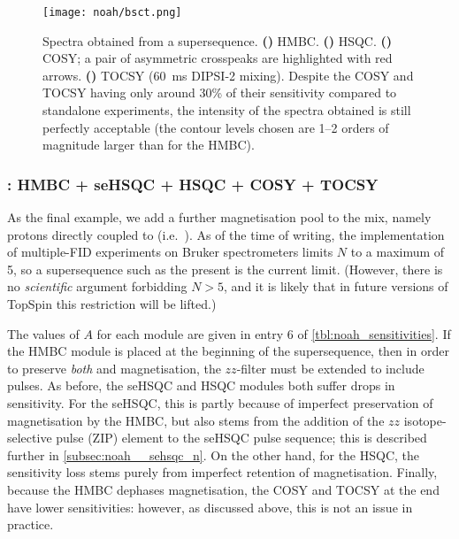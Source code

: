 \begin{figure}[!ht]
    \centering
    \texttt{[image: noah/bsct.png]}%
    {\label{fig:bsct_b}}%
    {\label{fig:bsct_s}}%
    {\label{fig:bsct_c}}%
    {\label{fig:bsct_t}}%
    \caption[Spectra obtained from a  supersequence.]{
        Spectra obtained from a  supersequence. 
        \textbf{()} HMBC.
        \textbf{()} HSQC.
        \textbf{()} COSY; a pair of asymmetric crosspeaks are highlighted with red arrows.
        \textbf{()} TOCSY (\qty{60}{\ms} DIPSI-2 mixing).
        Despite the COSY and TOCSY having only around 30\% of their sensitivity compared to standalone experiments, the intensity of the spectra obtained is still perfectly acceptable (the contour levels chosen are 1--2 orders of magnitude larger than for the HMBC).
    }
    \label{fig:bsct}
\end{figure}


\subsubsection{: HMBC + \nitrogen{} seHSQC + HSQC + COSY + TOCSY}

As the final example, we add a further magnetisation pool to the mix, namely protons directly coupled to \nitrogen{} (i.e.\ ).
As of the time of writing, the implementation of multiple-FID experiments on Bruker spectrometers limits $N$ to a maximum of 5, so a supersequence such as the present  is the current limit.
(However, there is no \textit{scientific} argument forbidding $N > 5$, and it is likely that in future versions of TopSpin this restriction will be lifted.)

The values of $A$ for each module are given in entry 6 of \cref{tbl:noah_sensitivities}.
If the HMBC module is placed at the beginning of the supersequence, then in order to preserve \textit{both}  and  magnetisation, the $zz$-filter must be extended to include \nitrogen{} pulses\autocite{Kupce2019JMR}.
As before, the \nitrogen{} seHSQC and \carbon{} HSQC modules both suffer drops in sensitivity.
For the \nitrogen{} seHSQC, this is partly because of imperfect preservation of  magnetisation by the HMBC, but also stems from the addition of the $zz$ isotope-selective pulse (ZIP) element to the seHSQC pulse sequence; this is described further in \cref{subsec:noah__sehsqc_n}.
On the other hand, for the \carbon{} HSQC, the sensitivity loss stems purely from imperfect retention of  magnetisation.
Finally, because the HMBC dephases  magnetisation, the COSY and TOCSY at the end have lower sensitivities: however, as discussed above, this is not an issue in practice.


